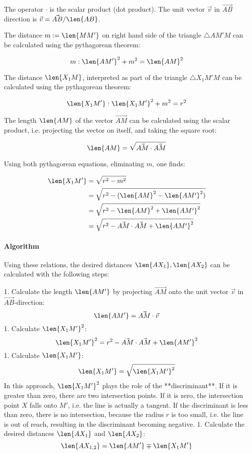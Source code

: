 The operator $\cdot$ is the scalar product (dot product). The unit vector $\vec{v}$ in $\vec{AB}$ direction is $\vec{v} = \vec{AB} / \len{AB}$.

The distance $m:=\len{MM'}$ on right hand side of the triangle $\triangle AM'M$ can be calculated using the pythagorean theorem:

\begin{equation} m: \len{AM'}^2 + m^2 = \len{AM}^2 \end{equation}

The distance $\len{X_1 M}$, interpreted as part of the triangle $\triangle X_1 M' M$ can be calculated using the pythagorean theorem:

\begin{equation} \len{X_1 M'}: \len{X_1 M'}^2 + m^2 = r^2 \end{equation}

The length $\len{AM}$ of the vector $\vec{AM}$ can be calculated using the scalar product, i.e. projecting the vector on itself, and taking the square root:

\begin{equation} \len{AM} = \sqrt{\vec{AM} \cdot \vec{AM}} \end{equation}

Using both pythagorean equations, eliminating $m$, one finds:

\begin{equation}\begin{split}
  \len{X_1 M'} &= \sqrt{r^2 - m^2} \\
    &= \sqrt{r^2 - (\len{AM}^2 - \len{AM'}^2)} \\
    &= \sqrt{r^2 - \len{AM}^2 + \len{AM'}^2} \\
    &= \sqrt{r^2 - \vec{AM} \cdot \vec{AM} + \len{AM'}^2}
\end{split}\end{equation}

\paragraph{Algorithm} Using these relations, the desired distances $\len{AX_1}, \len{AX_2}$ can be calculated with the following steps:

1. Calculate the length $\len{AM'}$ by projecting $\vec{AM}$ onto the unit vector $\vec{v}$ in $\vec{AB}$-direction: $$ \len{AM'} = \vec{AM} \cdot \vec{v} $$
1. Calculate $\len{X_1M'}^2$: $$ \len{X_1 M'}^2 = r^2 - \vec{AM} \cdot \vec{AM} + \len{AM'}^2 $$
1. Calculate $\len{X_1M'}$: $$ \len{X_1 M'} = \sqrt{\len{X_1 M'}^2} $$ In this approach, $\len{X_1M'}^2$ plays the role of the **discriminant**. If it is greater than zero, there are two intersection points. If it is zero, the intersection point $X$ falls onto $M'$, i.e. the line is actually a tangent. If the discriminant is less than zero, there is no intersection, because the radius $r$ is too small, i.e. the line is out of reach, resulting in the discriminant becoming negative.
1. Calculate the desired distances $\len{AX_1}$ and $\len{AX_2}$: $$ \len{A X_{1,2}} = \len{A M'} \mp \len{X_1 M'} $$

